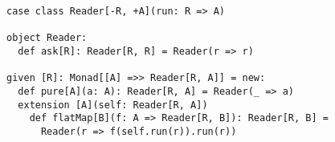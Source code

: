 \begin{algorithm}

\begin{verbatim}
case class Reader[-R, +A](run: R => A)

object Reader:
  def ask[R]: Reader[R, R] = Reader(r => r)

given [R]: Monad[[A] =>> Reader[R, A]] = new:
  def pure[A](a: A): Reader[R, A] = Reader(_ => a)
  extension [A](self: Reader[R, A])
    def flatMap[B](f: A => Reader[R, B]): Reader[R, B] =
      Reader(r => f(self.run(r)).run(r))
\end{verbatim}

\caption{Reader monad in Scala %
\label{monad:reader}}
\end{algorithm}